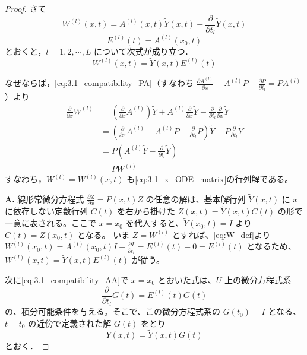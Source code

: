 \begin{proof}
さて
\begin{equation}\label{eq:W_def}
  W^{(l)}(x,t) = A^{(l)}(x,t)\tilde{Y}(x,t) - \frac{\partial}{\partial t_l}\tilde{Y}(x,t)
\end{equation}
\[
  E^{(l)}(t) = A^{(l)}(x_0,t)
\]
とおくと，$l=1,2,\cdots,L$ について次式が成り立つ．
\begin{equation}\label{eq:W_rel}
  W^{(l)}(x,t) = \tilde{Y}(x,t)E^{(l)}(t)
\end{equation}

なぜならば，\eqref{eq:3.1_compatibility_PA}（すなわち $\frac{\partial A^{(l)}}{\partial x} + A^{(l)}P - \frac{\partial P}{\partial t_l} = PA^{(l)}$）より
\begin{align*}
  \frac{\partial}{\partial x}W^{(l)} 
  &= \left( \frac{\partial}{\partial x}A^{(l)} \right)\tilde{Y} + A^{(l)}\frac{\partial}{\partial x}\tilde{Y} - \frac{\partial}{\partial t_l}\frac{\partial}{\partial x}\tilde{Y} \\[2mm]
  &= \left( \frac{\partial}{\partial x}A^{(l)} + A^{(l)}P - \frac{\partial}{\partial t_l}P \right)\tilde{Y} - P\frac{\partial}{\partial t_l}\tilde{Y} \\[2mm]
  &= P \left( A^{(l)}\tilde{Y} - \frac{\partial}{\partial t_l}\tilde{Y} \right) \\[2mm]
  &= P W^{(l)}
\end{align*}
すなわち，$W^{(l)} = W^{(l)}(x,t)$ も\eqref{eq:3.1_x_ODE_matrix}の行列解である。

\begin{Q}
\textbf{A.} 線形常微分方程式 $\frac{\partial Z}{\partial x} = P(x,t)Z$ の任意の解は、基本解行列 $\tilde{Y}(x,t)$ に $x$ に依存しない定数行列 $C(t)$ を右から掛けた $Z(x,t) = \tilde{Y}(x,t)C(t)$ の形で一意に表される。ここで $x=x_0$ を代入すると、$\tilde{Y}(x_0,t) = I$ より $C(t) = Z(x_0,t)$ となる。
いま $Z = W^{(l)}$ とすれば、\eqref{eq:W_def}より
$W^{(l)}(x_0,t) = A^{(l)}(x_0,t)I - \frac{\partial I}{\partial t_l} = E^{(l)}(t) - 0 = E^{(l)}(t)$ 
となるため、$W^{(l)}(x,t) = \tilde{Y}(x,t)E^{(l)}(t)$ が従う。
\end{Q}

次に\eqref{eq:3.1_compatibility_AA}で $x=x_0$ とおいた式は、$U$ 上の微分方程式系
\[
  \frac{\partial}{\partial t_l}G(t) = E^{(l)}(t)G(t)
\]
の、積分可能条件を与える。そこで、この微分方程式系の $G(t_0)=I$ となる、$t=t_0$ の近傍で定義された解 $G(t)$ をとり
\[
  Y(x,t) = \tilde{Y}(x,t)G(t)
\]
とおく．


\end{proof}
